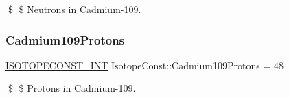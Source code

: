 \$ \$ Neutrons in Cadmium-\/109. \mbox{\label{group___isotope_const-_cadmium-_cd109_ga17ad24b119b70aefd0c6960978c1ccca}} 
\subsubsection{\texorpdfstring{Cadmium109\+Protons}{Cadmium109Protons}}
{\footnotesize\ttfamily \mbox{\hyperlink{group___isotope_const-_macros_ga5f18360b3e99483a35c32d789e62621c}{I\+S\+O\+T\+O\+P\+E\+C\+O\+N\+S\+T\+\_\+\+I\+NT}} Isotope\+Const\+::\+Cadmium109\+Protons = 48}

\$ \$ Protons in Cadmium-\/109. 